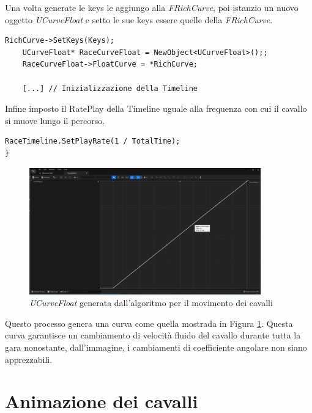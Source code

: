         Una volta generate le keys le aggiungo alla \textit{FRichCurve}, poi istanzio un nuovo oggetto \textit{UCurveFloat} e setto le sue keys essere quelle della \textit{FRichCurve}.

        \begin{lstlisting}[firstnumber=40]
    RichCurve->SetKeys(Keys);
    UCurveFloat* RaceCurveFloat = NewObject<UCurveFloat>();;
    RaceCurveFloat->FloatCurve = *RichCurve;

    [...] // Inizializzazione della Timeline
        \end{lstlisting}

        Infine imposto il RatePlay della Timeline uguale alla frequenza con cui il cavallo si muove lungo il percorso.

        \begin{lstlisting}[firstnumber=46]
    RaceTimeline.SetPlayRate(1 / TotalTime);	
}
        \end{lstlisting}

        \begin{figure}[!ht]
            \centering
            \includegraphics[width=10cm]{figure/FloatCurve.png}
            \caption{\textit{UCurveFloat} generata dall'algoritmo per il movimento dei cavalli}
            \label{fig:CurveFloat}
        \end{figure}

        Questo processo genera una curva come quella mostrada in Figura \ref{fig:CurveFloat}.
        Questa curva garantisce un cambiamento di velocità fluido del cavallo durante tutta la gara nonostante, dall'immagine, i cambiamenti di coefficiente angolare non siano apprezzabili.

    \section{Animazione dei cavalli}

